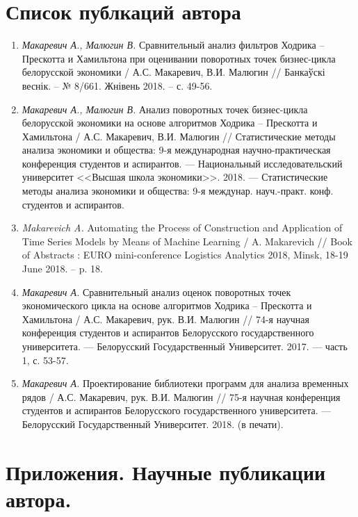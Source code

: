 \documentclass[a4paper,14pt]{extreport}
\begin{document}
	\chapter*{Список публкаций автора}
	\begin{enumerate}[label=A\arabic*.]
		\item \textit{Макаревич А., Малюгин В.} Сравнительный анализ фильтров Ходрика -- Прескотта и Хамильтона при оценивании поворотных точек бизнес-цикла белорусской экономики / А.С. Макаревич, В.И. Малюгин // Банкаўскі веснік. -- № 8/661. Жнівень 2018. -- с. 49-56.
		
		\item \textit{Макаревич А., Малюгин В.} Анализ поворотных точек бизнес-цикла белорусской экономики на основе алгоритмов Ходрика -- Прескотта и Хамильтона / А.С. Макаревич, В.И. Малюгин // Статистические методы анализа экономики и общества: 9-я международная научно-практическая конференция студентов и аспирантов. — Национальный исследовательский университет <<Высшая школа экономики>>. 2018. — Статистические методы анализа экономики и общества: 9-я междунар. науч.-практ. конф. студентов и аспирантов.
		
		\item \textit{Makarevich A.} Automating the Process of Construction and Application of Time Series Models by Means of Machine Learning / A. Makarevich // Book of Abstracts : EURO mini-conference Logistics Analytics 2018, Minsk, 18-19 June 2018. -- p. 18.
		
		\item \textit{Макаревич А.} Сравнительный анализ оценок поворотных точек экономического цикла на основе алгоритмов Ходрика -- Прескотта и Хамильтона / А.С. Макаревич, рук. В.И. Малюгин // 74-я научная конференция студентов и аспирантов Белорусского государственного университета. — Белорусский Государственный Университет. 2017. — часть 1, с. 53-57.
		
		\item \textit{Макаревич А.} Проектирование библиотеки программ для анализа временных рядов / А.С. Макаревич, рук. В.И. Малюгин // 75-я научная конференция студентов и аспирантов Белорусского государственного университета. — Белорусский Государственный Университет. 2018. (в печати).
	\end{enumerate}
	
	
	\chapter*{Приложения. Научные публикации автора.}
	
\end{document}
